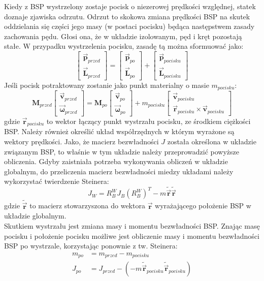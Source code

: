 Kiedy z BSP wystrzelony zostaje pocisk o niezerowej prędkości względnej, statek doznaje zjawiska odrzutu. Odrzut to skokowa zmiana prędkości BSP na skutek oddzielania się części jego masy (w postaci pocisku) będąca następstwem zasady zachowania pędu. Głosi ona, że w układzie izolowanym, pęd i kręt pozostają stałe. W przypadku wystrzelenia pocisku, zasadę tą można sformuować jako:
\[
	\begin{bmatrix}
	\vec{\bm{p}}_{przed}\\
	\vec{\bm{L}}_{przed}
	\end{bmatrix}
	=
	\begin{bmatrix}
	\vec{\bm{p}}_{po}\\
	\vec{\bm{L}}_{po}
	\end{bmatrix}
	+	
	\begin{bmatrix}
	\vec{\bm{p}}_{pocisku}\\
	\vec{\bm{L}}_{pocisku}
	\end{bmatrix}	
\]
Jeśli pocisk potraktowany zostanie jako punkt materialny o masie $m_{pocisku}$:
\[
	\bm{M}_{przed}
	\begin{bmatrix}
	\vec{\bm{v}}_{przed}\\
	\vec{\bm{\omega}}_{przed}
	\end{bmatrix}
	=
	\bm{M}_{po}
	\begin{bmatrix}
	\vec{\bm{v}}_{po}\\
	\vec{\bm{\omega}}_{po}
	\end{bmatrix}
	+
	m_{pocisku}
	\begin{bmatrix}
	\vec{\bm{v}}_{pocisku}\\
	\vec{\bm{r}}_{pocisku} \times  \vec{\bm{v}}_{pocisku}
	\end{bmatrix}	
\]
gdzie $\vec{\bm{r}}_{pocisku}$ to wektor łączący punkt wystrzału pocisku, ze środkiem ciężkości BSP. Należy również określić układ współrzędnych w którym wyrażone są wektory prędkości. Jako, że macierz bezwładności $J$ została określona w układzie związanym BSP, to właśnie w tym układzie należy przeprowadzić powyższe obliczenia. Gdyby zaistniała potrzeba wykonywania obliczeń w układzie globalnym, do przeliczenia macierz bezwładności miedzy układami należy wykorzystać twierdzenie Steinera:
\[
	J_W = R_B^W J_B (R_B^W)^T - m \tilde{\vec{\bm{r}}} \tilde{\vec{\bm{r}}}
\]
gdzie $ \tilde{\vec{\bm{r}}}$ to macierz stowarzyszona do wektora $\vec{\bm{r}}$ wyrażającego położenie BSP w układzie globalnym.\\

Skutkiem wystrzału jest zmiana masy i momentu bezwładności BSP. Znając masę pocisku i położenie pocisku możliwe jest obliczenie masy i momentu bezwładności BSP po wystrzale, korzystając ponownie z tw. Steinera:
\[
	\begin{aligned}
	m_{po} & = m_{przed} - m_{pocisku}\\
	J_{po} & = J_{przed}  - ( - m \tilde{\vec{\bm{r}}}_{pocisku} \tilde{\vec{\bm{r}}}_{pocisku} ) 
	\end{aligned}
\]

